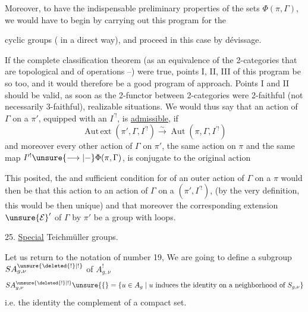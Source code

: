 Moreover, to have the indispensable preliminary properties of the sets $\Phi(\pi,\Gamma)$, we would have to begin by carrying out this program for the


cyclic groups ( in a direct way), and proceed in this case by dévissage.

If the complete classification theorem (as an equivalence of the 2-categories  that are topological and of  operations --) were true, points I, II, III of this program  be so too, and it would therefore be a good program of approach. Points I and II should be valid, as soon as the 2-functor between 2-categories were 2-faithful (not necessarily  3-faithful),   realizable situations. We would thus say that an  action of $\Gamma$ on a $\pi'$, equipped with an $I^{\prime !}$, is \uline{admissible}, if 
\[
\operatorname{Aut\,ext}(\pi',\Gamma,I^{\prime !})\xrightarrow{\sim}\operatorname{Aut}(\pi,\Gamma,I^{\prime !})
\]
and  moreover every  other action of $\Gamma$ on $\pi'$,  the same action on $\pi$ and the same map $I^{\prime !}\unsure{\longrightarrow|{-}}\Phi(\pi,\Gamma)$, is conjugate to the original action


This posited, the  and sufficient condition for  of an outer  action of $\Gamma$ on a $\pi$ would then be that this action   to an action  of $\Gamma$ on a $(\pi',I^{\prime !})$,  (by the very definition, this  would be  then  unique) and that moreover the corresponding extension $\unsure{\mathcal E}'$ of $\Gamma$ by $\pi'$ be a group with loops.

25. \uline{Special} Teichmüller groups.

Let us return to the notation of number 19, We are going to define a subgroup $SA_{g,\nu}^{\unsure{\deleted{!}|!}}$ of $A_{g,\nu}^{!}$
\[
SA_{g,\nu}^{\unsure{\deleted{!}|!}}\unsure{\{} =
\{u\in A_g\mid u\text{ induces the identity on a neighborhood of }S_{g,\nu}\}
\]
i.e.   the identity  the complement of a compact set.

